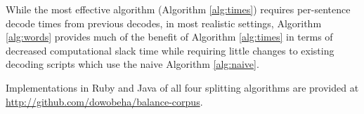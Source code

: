 \documentclass{pbml}
\begin{document}
While the most effective algorithm (Algorithm \ref{alg:times}) requires per-sentence decode times from previous decodes, in most realistic settings, Algorithm \ref{alg:words} provides much of the benefit of Algorithm \ref{alg:times} in terms of decreased computational slack time while requiring little changes to existing decoding scripts which use the naive Algorithm \ref{alg:naive}.


Implementations in Ruby and Java of all four splitting algorithms are provided at \url{http://github.com/dowobeha/balance-corpus}.





















\clearpage
{}


\end{document}
